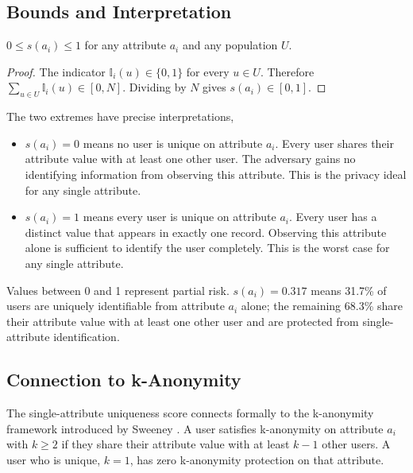 \subsection{Bounds and Interpretation}

\begin{proposition}
$0 \leq s(a_i) \leq 1$ for any attribute $a_i$ and any
population $U$.
\end{proposition}

\begin{proof}
The indicator $\mathbb{I}_i(u) \in \{0, 1\}$ for every
$u \in U$. Therefore $\sum_{u \in U} \mathbb{I}_i(u)
\in [0, N]$. Dividing by $N$ gives $s(a_i) \in [0, 1]$.
\end{proof}

The two extremes have precise interpretations,

\begin{itemize}
    \item $s(a_i) = 0$ means no user is unique on attribute
    $a_i$. Every user shares their attribute value with at
    least one other user. The adversary gains no identifying
    information from observing this attribute. This is the
    privacy ideal for any single attribute.

    \item $s(a_i) = 1$ means every user is unique on
    attribute $a_i$. Every user has a distinct value that
    appears in exactly one record. Observing this attribute
    alone is sufficient to identify the user completely.
    This is the worst case for any single attribute.
\end{itemize}

Values between 0 and 1 represent partial risk. $s(a_i) =
0.317$ means 31.7\% of users are uniquely identifiable
from attribute $a_i$ alone; the remaining 68.3\% share
their attribute value with at least one other user and
are protected from single-attribute identification.

\subsection{Connection to k-Anonymity}

The single-attribute uniqueness score connects formally
to the k-anonymity framework introduced by Sweeney
\cite{sweeney2002}. A user satisfies k-anonymity
on attribute $a_i$ with $k \geq 2$ if they share their
attribute value with at least $k-1$ other users. A user
who is unique, $k=1$, has zero k-anonymity protection
on that attribute.

